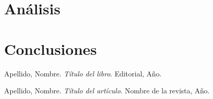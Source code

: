 \documentclass[12pt]{article}
\begin{document}
	\section{Análisis}
	
	\section{Conclusiones}
	
	\begin{thebibliography}{9}
		Apellido, Nombre.
		\textit{Título del libro}.
		Editorial, Año.
		
		Apellido, Nombre.
		\textit{Título del artículo}.
		Nombre de la revista, Año.
	\end{thebibliography}
	
\end{document}

